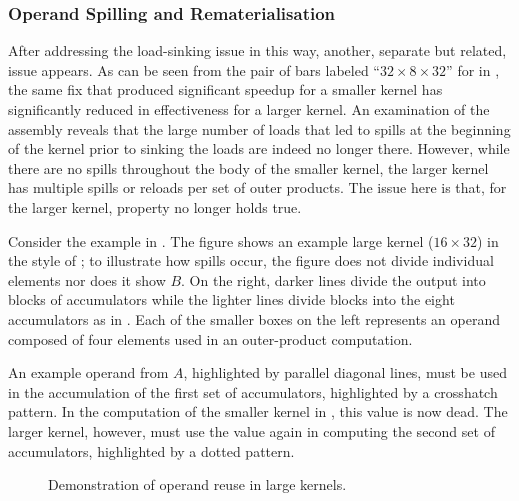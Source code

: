 \documentclass[\main/thesis.tex]{subfiles}
\begin{document}
\subsubsection{Operand Spilling and Rematerialisation}
After addressing the load-sinking issue in this way, another, separate but related, issue appears.
As can be seen from the pair of bars labeled ``$32 \times 8 \times 32$'' for  in , the same fix that produced significant speedup for a smaller kernel has significantly reduced in effectiveness for a larger kernel.
An examination of the assembly reveals that the large number of loads that led to spills at the beginning of the kernel prior to sinking the loads are indeed no longer there.
However, while there are no spills throughout the body of the smaller kernel, the larger kernel has multiple spills or reloads per set of outer products.
The issue here is that, for the larger kernel, property  no longer holds true.

Consider the example in .
The figure shows an example large kernel ($16 \times 32$) in the style of ; to illustrate how spills occur, the figure does not divide individual elements nor does it show $B$.
On the right, darker lines divide the output into blocks of accumulators while the lighter lines divide blocks into the eight accumulators as in .
Each of the smaller boxes on the left represents an operand composed of four  elements used in an outer-product computation.

An example operand from $A$, highlighted by parallel diagonal lines, must be used in the accumulation of the first set of accumulators, highlighted by a crosshatch pattern.
In the computation of the smaller kernel in , this value is now \gls{dead}.
The larger kernel, however, must use the value again in computing the second set of accumulators, highlighted by a dotted pattern.

\begin{figure}[t]
  \centering
  \caption[Large Kernel Operand Reuse]{Demonstration of operand reuse in large kernels.}
  \label{fig:opReuse}
\end{figure}
\end{document}
